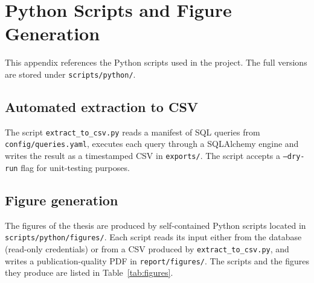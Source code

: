 \chapter{Python Scripts and Figure Generation}
\label{app:python}

This appendix references the Python scripts used in the project. The full versions are stored under \texttt{scripts/python/}.

\section{Automated extraction to CSV}
\label{sec:app-py-extract}
The script \texttt{extract\_to\_csv.py} reads a manifest of SQL queries from \texttt{config/queries.yaml}, executes each query through a SQLAlchemy engine and writes the result as a timestamped CSV in \texttt{exports/}. The script accepts a \texttt{--dry-run} flag for unit-testing purposes.

\section{Figure generation}
The figures of the thesis are produced by self-contained Python scripts located in \texttt{scripts/python/figures/}. Each script reads its input either from the database (read-only credentials) or from a CSV produced by \texttt{extract\_to\_csv.py}, and writes a publication-quality PDF in \texttt{report/figures/}. The scripts and the figures they produce are listed in Table~\ref{tab:figures}.

